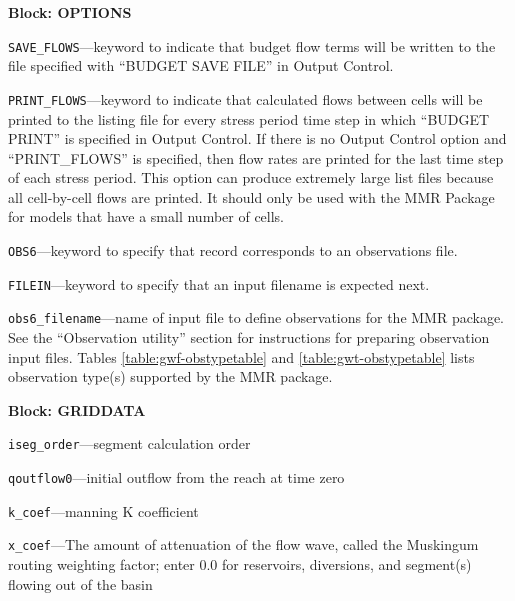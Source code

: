
\item \textbf{Block: OPTIONS}

\begin{description}
\item \texttt{SAVE\_FLOWS}---keyword to indicate that budget flow terms will be written to the file specified with ``BUDGET SAVE FILE'' in Output Control.

\item \texttt{PRINT\_FLOWS}---keyword to indicate that calculated flows between cells will be printed to the listing file for every stress period time step in which ``BUDGET PRINT'' is specified in Output Control. If there is no Output Control option and ``PRINT\_FLOWS'' is specified, then flow rates are printed for the last time step of each stress period.  This option can produce extremely large list files because all cell-by-cell flows are printed.  It should only be used with the MMR Package for models that have a small number of cells.

\item \texttt{OBS6}---keyword to specify that record corresponds to an observations file.

\item \texttt{FILEIN}---keyword to specify that an input filename is expected next.

\item \texttt{obs6\_filename}---name of input file to define observations for the MMR package. See the ``Observation utility'' section for instructions for preparing observation input files. Tables \ref{table:gwf-obstypetable} and \ref{table:gwt-obstypetable} lists observation type(s) supported by the MMR package.

\end{description}
\item \textbf{Block: GRIDDATA}

\begin{description}
\item \texttt{iseg\_order}---segment calculation order

\item \texttt{qoutflow0}---initial outflow from the reach at time zero

\item \texttt{k\_coef}---manning K coefficient

\item \texttt{x\_coef}---The amount of attenuation of the flow wave, called the Muskingum routing weighting factor; enter 0.0 for reservoirs, diversions, and segment(s) flowing out of the basin

\end{description}

